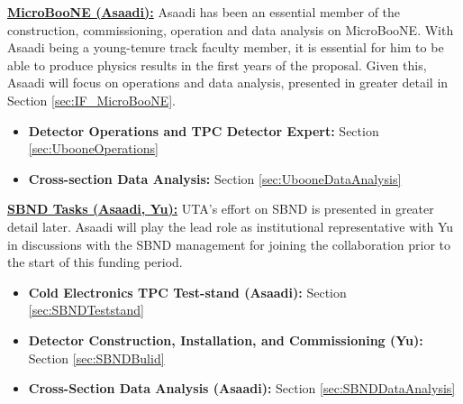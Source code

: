 

\noindent \underline{\textbf{MicroBooNE (Asaadi):}} Asaadi has been an essential member of the construction, commissioning, operation and data analysis on MicroBooNE. With Asaadi being a young-tenure track faculty member, it is essential for him to be able to produce physics results in the first years of the proposal. Given this, Asaadi will focus on operations and data analysis, presented in greater detail in Section \ref{sec:IF_MicroBooNE}.
\begin{itemize}
\item{\textbf{Detector Operations and TPC Detector Expert:}} Section \ref{sec:UbooneOperations}
\item{\textbf{Cross-section Data Analysis:}} Section \ref{sec:UbooneDataAnalysis}
\end{itemize}

\noindent \underline{\textbf{SBND Tasks (Asaadi, Yu):}}  UTA's effort on SBND is presented in greater detail later. Asaadi will play the lead role as institutional representative with Yu in discussions with the SBND management for joining the collaboration prior to the start of this funding period.
\begin{itemize}
\item{\textbf{Cold Electronics TPC Test-stand (Asaadi):}} Section \ref{sec:SBNDTeststand}
\item{\textbf{Detector Construction, Installation, and Commissioning (Yu):}} Section \ref{sec:SBNDBulid}
\item{\textbf{Cross-Section Data Analysis (Asaadi):}} Section \ref{sec:SBNDDataAnalysis}
\end{itemize}

